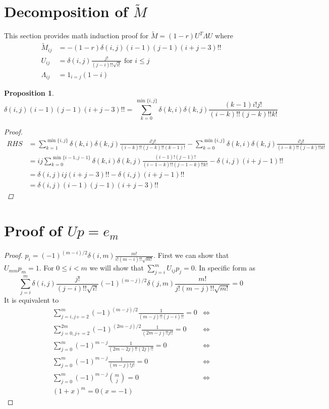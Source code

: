 \documentclass{article}
\newtheorem{proposition}{Proposition}
\begin{document}
\section{Decomposition of $\widetilde{M}$}
This section provides math induction proof for
$\widetilde{M}= (1-r) U^T \Lambda U$ where
\begin{align}
\widetilde{M}_{ij} & = -(1-r)\delta(i, j) (i-1)(j-1) (i+j-3)!! \\
U_{ij} & = \delta(i, j) \frac{j!}{(j-i)!!\sqrt{i!}} \textrm{ for } i\leq j \\
\Lambda_{ij} & = 1_{i = j} (1-i)
\end{align}
\begin{proposition}\label{prop:UUM}
\begin{equation}
\delta(i, j)(i-1)(j-1)(i+j-3)!! = \sum_{k=0}^{\min\{i, j\}}
\delta(k, i) \delta(k, j) \frac{(k-1)i!j!}{(i-k)!!(j-k)!!k!}
\end{equation}
\begin{proof}
\begin{align*}
RHS & =
\sum_{k=1}^{\min\{i, j\}}
\delta(k, i) \delta(k, j) \frac{i!j!}{(i-k)!!(j-k)!!(k-1)!} 
-  \sum_{k=0}^{\min\{i, j\}}
\delta(k, i) \delta(k, j) \frac{i!j!}{(i-k)!!(j-k)!!k!} \\
& = ij\sum_{k=0}^{\min\{i-1, j-1\}}
\delta(k, i) \delta(k, j) \frac{(i-1)!(j-1)!}{(i-1-k)!!(j-1-k)!!k!} - \delta(i, j)(i+j-1)!! \\
& =  \delta(i, j)ij(i+j-3)!! - \delta(i, j)(i+j-1)!!\\
& = \delta(i, j)(i-1)(j-1)(i+j-3)!!
\end{align*}
\end{proof}
\end{proposition}
\section{Proof of $Up=e_m$}
\begin{proof}
$p_i = (-1)^{(m-i)/2}\delta(i, m) \frac{m!}{i!(m-i)!! \sqrt{m!}} $.
First we can show that $U_{mm} p_m = 1 $. For $ 0\leq i < m $ we
will show that $ \sum_{j=i}^m U_{ij} p_j = 0 $. In specific form as
\begin{equation}
\sum_{j=i}^m \delta(i, j) \frac{j!}{(j-i)!!\sqrt{i!}} (-1)^{(m-j)/2}\delta(j, m) \frac{m!}{j!(m-j)!! \sqrt{m!}} = 0
\end{equation}
It is equivalent to
\begin{align*}
\sum_{j=i, j+=2}^m (-1)^{(m-j)/2} \frac{1}{(m-j)!!(j-i)!!}  = 0 & \iff \\ 
\sum_{j=0, j+=2}^{2m} (-1)^{(2m-j)/2} \frac{1}{(2m-j)!! j!!} = 0 & \iff \\
\sum_{j=0}^{m} (-1)^{m-j} \frac{1}{(2m-2j)!! (2j)!!} = 0 & \iff \\
\sum_{j=0}^{m} (-1)^{m-j} \frac{1}{(m-j)! j!} = 0 & \iff \\
\sum_{j=0}^{m} (-1)^{m-j} \binom{m}{j} = 0 & \iff \\
(1+x)^m = 0 (x=-1)
\end{align*}
\end{proof}
\end{document}
